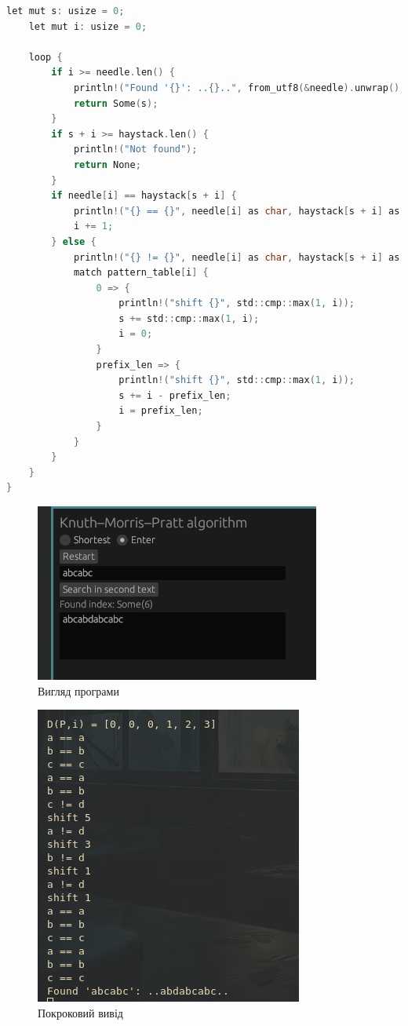 \documentclass{article}
\begin{document}
\begin{normalsize}
\begin{lstlisting}[language=C]
	let mut s: usize = 0;
	let mut i: usize = 0;
	
	loop {
		if i >= needle.len() {
			println!("Found '{}': ..{}..", from_utf8(&needle).unwrap(), from_utf8(&haystack[s.checked_sub(3).unwrap_or(0)..usize::min(s+needle.len()+3, haystack.len())]).unwrap());
			return Some(s);
		}
		if s + i >= haystack.len() {
			println!("Not found");
			return None;
		}
		if needle[i] == haystack[s + i] {
			println!("{} == {}", needle[i] as char, haystack[s + i] as char);
			i += 1;
		} else {
			println!("{} != {}", needle[i] as char, haystack[s + i] as char);
			match pattern_table[i] {
				0 => {
					println!("shift {}", std::cmp::max(1, i));
					s += std::cmp::max(1, i);
					i = 0;
				}
				prefix_len => {
					println!("shift {}", std::cmp::max(1, i));
					s += i - prefix_len;
					i = prefix_len;
				}
			}
		}
	}
}

		\end{lstlisting}
		
		\begin{figure}[H]
			\centering
			\includegraphics[scale=0.7]{1}
			\caption{Вигляд програми}
		\end{figure}
		
		\begin{figure}[H]
			\centering
			\includegraphics[scale=0.7]{2}
			\caption{Покроковий вивід}
		\end{figure}
		

\end{normalsize}
\end{document}
